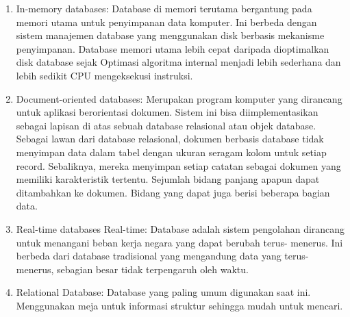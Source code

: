 \begin{enumerate}
\noindent 
\item In-memory databases: Database di memori terutama bergantung pada memori utama untuk penyimpanan data komputer. Ini berbeda dengan sistem manajemen database yang menggunakan disk berbasis mekanisme penyimpanan. Database memori utama lebih cepat daripada dioptimalkan disk database sejak Optimasi algoritma internal menjadi lebih sederhana dan lebih sedikit CPU mengeksekusi instruksi. \par
\noindent 
\item Document-oriented databases: Merupakan program komputer yang dirancang untuk aplikasi berorientasi dokumen. Sistem ini bisa diimplementasikan sebagai lapisan di atas sebuah database relasional atau objek database. Sebagai lawan dari database relasional, dokumen berbasis database tidak menyimpan data dalam tabel dengan ukuran seragam kolom untuk setiap record. Sebaliknya, mereka menyimpan setiap catatan sebagai dokumen yang memiliki karakteristik tertentu. Sejumlah bidang panjang apapun dapat ditambahkan ke dokumen. Bidang yang dapat juga berisi beberapa bagian data. 
\noindent 
\item Real-time databases Real-time: Database adalah sistem pengolahan dirancang untuk menangani beban kerja negara yang dapat berubah terus- menerus. Ini berbeda dari database tradisional yang mengandung data yang terus- menerus, sebagian besar tidak terpengaruh oleh waktu. 
\noindent 
\item Relational Database: Database yang paling umum digunakan saat ini. Menggunakan meja untuk informasi struktur sehingga mudah untuk mencari.\end{enumerate}
 
